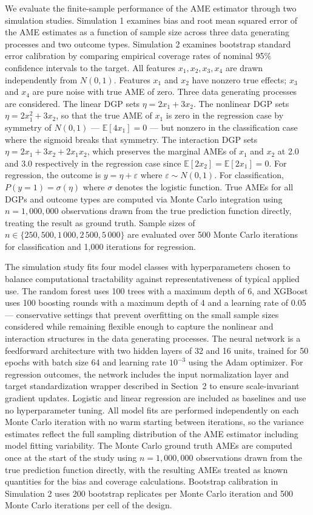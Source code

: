 \documentclass[12pt]{article}
\begin{document}
	We evaluate the finite-sample performance of the AME estimator through two simulation studies. Simulation 1 examines bias and root mean squared error of the AME estimates as a function of sample size across three data generating processes and two outcome types. Simulation 2 examines bootstrap standard error calibration by comparing empirical coverage rates of nominal 95\% confidence intervals to the target. All features $x_1, x_2, x_3, x_4$ are drawn independently from $N(0,1)$. Features $x_1$ and $x_2$ have nonzero true effects; $x_3$ and $x_4$ are pure noise with true AME of zero. Three data generating processes are considered. The linear DGP sets $\eta = 2x_1 + 3x_2$. The nonlinear DGP sets $\eta = 2x_1^2 + 3x_2$, so that the true AME of $x_1$ is zero in the regression case by symmetry of $N(0,1)$ --- $\mathbb{E}[4x_1] = 0$ --- but nonzero in the classification case where the sigmoid breaks that symmetry. The interaction DGP sets $\eta = 2x_1 + 3x_2 + 2x_1 x_2$, which preserves the marginal AMEs of $x_1$ and $x_2$ at 2.0 and 3.0 respectively in the regression case since $\mathbb{E}[2x_2] = \mathbb{E}[2x_1] = 0$. For regression, the outcome is $y = \eta + \varepsilon$ where $\varepsilon \sim N(0,1)$. For classification, $P(y=1) = \sigma(\eta)$ where $\sigma$ denotes the logistic function. True AMEs for all DGPs and outcome types are computed via Monte Carlo integration using $n = 1{,}000{,}000$ observations drawn from the true prediction function directly, treating the result as ground truth. Sample sizes of $n \in \{250, 500, 1\,000, 2\,500, 5\,000\}$ are evaluated over 500 Monte Carlo iterations for classification and 1{,}000 iterations for regression.
	
	The simulation study fits four model classes with hyperparameters chosen to balance computational tractability against representativeness of typical applied use. The random forest uses 100 trees with a maximum depth of 6, and XGBoost uses 100 boosting rounds with a maximum depth of 4 and a learning rate of 0.05 --- conservative settings that prevent overfitting on the small sample sizes considered while remaining flexible enough to capture the nonlinear and interaction structures in the data generating processes. The neural network is a feedforward architecture with two hidden layers of 32 and 16 units, trained for 50 epochs with batch size 64 and learning rate $10^{-3}$ using the Adam optimizer. For regression outcomes, the network includes the input normalization layer and target standardization wrapper described in Section~2 to ensure scale-invariant gradient updates. Logistic and linear regression are included as baselines and use no hyperparameter tuning. All model fits are performed independently on each Monte Carlo iteration with no warm starting between iterations, so the variance estimates reflect the full sampling distribution of the AME estimator including model fitting variability. The Monte Carlo ground truth AMEs are computed once at the start of the study using $n=1{,}000{,}000$ observations drawn from the true prediction function directly, with the resulting AMEs treated as known quantities for the bias and coverage calculations. Bootstrap calibration in Simulation 2 uses 200 bootstrap replicates per Monte Carlo iteration and 500 Monte Carlo iterations per cell of the design.
	
\end{document}
